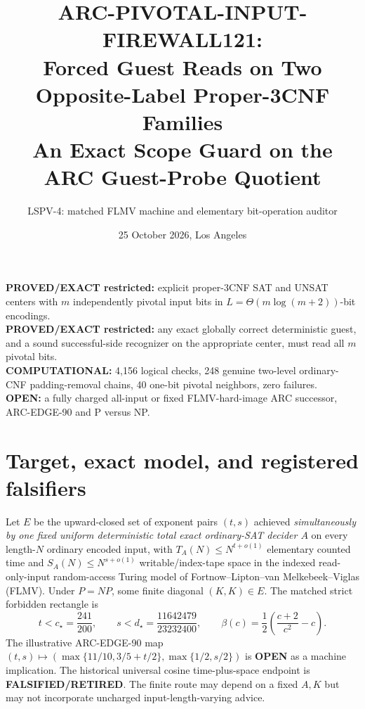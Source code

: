 \documentclass[11pt]{article}
\title{ARC-PIVOTAL-INPUT-FIREWALL121:\\
\large Forced Guest Reads on Two Opposite-Label Proper-3CNF Families\\
\small An Exact Scope Guard on the ARC Guest-Probe Quotient}
\author{LSPV-4: matched FLMV machine and elementary bit-operation auditor}
\date{25 October 2026, Los Angeles}
\newcommand{\OPEN}{\textbf{OPEN}}
\begin{document}
\maketitle
\begin{center}
\textbf{PROVED/EXACT restricted:} explicit proper-3CNF SAT and UNSAT centers
with $m$ independently pivotal input bits in $L=\Theta(m\log(m+2))$-bit encodings.\\
\textbf{PROVED/EXACT restricted:} any exact globally correct deterministic guest,
and a sound successful-side recognizer on the appropriate center, must
read all $m$ pivotal bits.\\
\textbf{COMPUTATIONAL:} 4,156 logical checks, 248 genuine two-level
ordinary-CNF padding-removal chains, 40 one-bit pivotal neighbors,
zero failures.\\
\textbf{OPEN:} a fully charged all-input or fixed FLMV-hard-image ARC successor,
ARC-EDGE-90 and P versus NP.
\end{center}

\section{Target, exact model, and registered falsifiers}
Let $E$ be the upward-closed set of exponent pairs $(t,s)$ achieved
\emph{simultaneously by one fixed uniform deterministic total exact ordinary-SAT
decider $A$} on every length-$N$ ordinary encoded input, with
$T_A(N)\le N^{t+o(1)}$ elementary counted time and
$S_A(N)\le N^{s+o(1)}$ writable/index-tape space in the indexed
read-only-input random-access Turing model of Fortnow--Lipton--van
Melkebeek--Viglas (FLMV). Under $P=NP$, some finite diagonal
$(K,K)\in E$. The matched strict forbidden rectangle is
\[
 t<c_\star=\frac{241}{200},\qquad
 s<d_\star=\frac{11642479}{23232400},\qquad
 \beta(c)=\frac12\left(\frac{c+2}{c^2}-c\right).
\]
The illustrative ARC-EDGE-90 map
$(t,s)\mapsto(\max\{11/10,3/5+t/2\},\max\{1/2,s/2\})$
is \OPEN{} as a machine implication. The historical universal cosine
time-plus-space endpoint is \textbf{FALSIFIED/RETIRED}.
The finite route may depend on a fixed $A,K$ but may not incorporate
uncharged input-length-varying advice.
\end{document}
